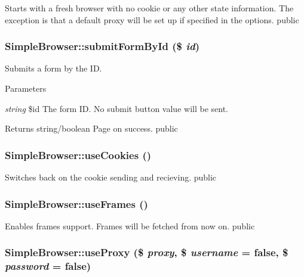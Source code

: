 \label{class_simple_browser_a91c688a632c8e9378d82bc9cad80ed2a}
Starts with a fresh browser with no cookie or any other state information. The exception is that a default proxy will be set up if specified in the options.  public \hypertarget{class_simple_browser_a26f0d417c5ebdc85111f076b2e451f07}{
\subsubsection[{submitFormById}]{\setlength{\rightskip}{0pt plus 5cm}SimpleBrowser::submitFormById (\$ {\em id})}}
\label{class_simple_browser_a26f0d417c5ebdc85111f076b2e451f07}
Submits a form by the ID. 
\begin{DoxyParams}{Parameters}
\item[{\em string}]\$id The form ID. No submit button value will be sent. \end{DoxyParams}
\begin{DoxyReturn}{Returns}
string/boolean Page on success.  public 
\end{DoxyReturn}
\hypertarget{class_simple_browser_ae56fff4a6243ee4b0e938a3ef1a31bf8}{
\subsubsection[{useCookies}]{\setlength{\rightskip}{0pt plus 5cm}SimpleBrowser::useCookies ()}}
\label{class_simple_browser_ae56fff4a6243ee4b0e938a3ef1a31bf8}
Switches back on the cookie sending and recieving.  public \hypertarget{class_simple_browser_ab27fafcc008f75fb25256282c1c9871e}{
\subsubsection[{useFrames}]{\setlength{\rightskip}{0pt plus 5cm}SimpleBrowser::useFrames ()}}
\label{class_simple_browser_ab27fafcc008f75fb25256282c1c9871e}
Enables frames support. Frames will be fetched from now on.  public \hypertarget{class_simple_browser_afcbae738b78039eaf3995f1fb4813b4c}{
\subsubsection[{useProxy}]{\setlength{\rightskip}{0pt plus 5cm}SimpleBrowser::useProxy (\$ {\em proxy}, \/  \$ {\em username} = {\ttfamily false}, \/  \$ {\em password} = {\ttfamily false})}}
